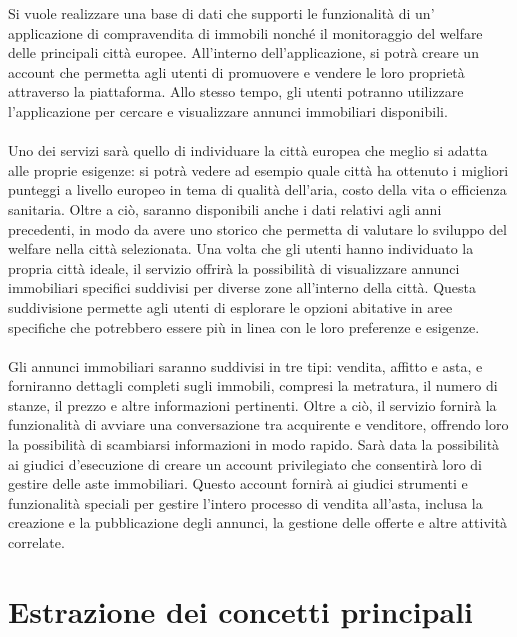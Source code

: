 \documentclass[a4paper,12pt]{report}
\begin{document}
        Si vuole realizzare una base di dati che supporti le funzionalità di un' applicazione di compravendita di immobili nonché il monitoraggio del welfare delle principali città europee. All'interno dell'applicazione, si potrà creare un account che permetta agli utenti di promuovere e vendere le loro proprietà attraverso la piattaforma. Allo stesso tempo, gli utenti potranno utilizzare l'applicazione per cercare e visualizzare annunci immobiliari disponibili. \\ \\ Uno dei servizi sarà quello di individuare la città europea che meglio si adatta alle proprie esigenze: si potrà vedere ad esempio quale città ha ottenuto i migliori punteggi a livello europeo in tema di qualità dell'aria, costo della vita o efficienza sanitaria. Oltre a ciò, saranno disponibili anche i dati relativi agli anni precedenti, in modo da avere uno storico che permetta di valutare lo sviluppo del welfare nella città selezionata. 
        Una volta che gli utenti hanno individuato la propria città ideale, il servizio offrirà la possibilità di visualizzare annunci immobiliari specifici suddivisi per diverse zone all'interno della città. 
        Questa suddivisione permette agli utenti di esplorare le opzioni abitative in aree specifiche che potrebbero essere più in linea con le loro preferenze e esigenze. \\ \\ Gli annunci immobiliari saranno suddivisi in tre tipi: vendita, affitto e asta, e forniranno dettagli completi sugli immobili, compresi la metratura, il numero di stanze, il prezzo e altre informazioni pertinenti. Oltre a ciò, il servizio fornirà la funzionalità di avviare una conversazione tra acquirente e venditore, offrendo loro la possibilità di scambiarsi informazioni in modo rapido. Sarà data la possibilità ai giudici d'esecuzione di creare un account privilegiato che consentirà loro di gestire delle aste immobiliari. Questo account fornirà ai giudici strumenti e funzionalità speciali per gestire l'intero processo di vendita all'asta, inclusa la creazione e la pubblicazione degli annunci, la gestione delle offerte e altre attività correlate.

    	\section{Estrazione dei concetti principali}
\end{document}
